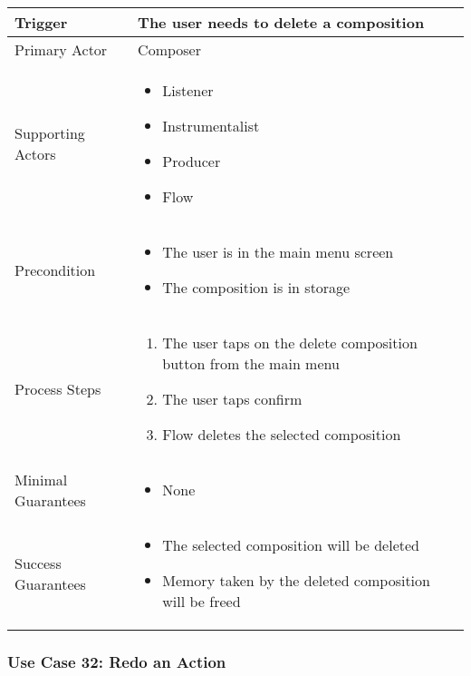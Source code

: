 \begin{tabularx}{\textwidth}{|X|X|}
\hline
Trigger & 
The user needs to delete a composition \\
\hline
Primary Actor & 
Composer \\
\hline
Supporting Actors & 
\begin{itemize}
\item Listener
\item Instrumentalist
\item Producer
\item Flow
\end{itemize} \\
\hline
Precondition & 
\begin{itemize}
\item The user is in the main menu screen
\item The composition is in storage
\end{itemize} \\
\hline
Process Steps & 
\begin{enumerate}
\item The user taps on the delete composition button from the main menu
\item The user taps confirm
\item Flow deletes the selected composition
\end{enumerate} \\
\hline
Minimal Guarantees & 
\begin{itemize}
  \item None
\end{itemize} \\
\hline
Success Guarantees & 
\begin{itemize}
  \item The selected composition will be deleted
  \item Memory taken by the deleted composition will be freed
\end{itemize} \\
\hline
\end{tabularx}

\subsubsection{Use Case 32: Redo an Action}

